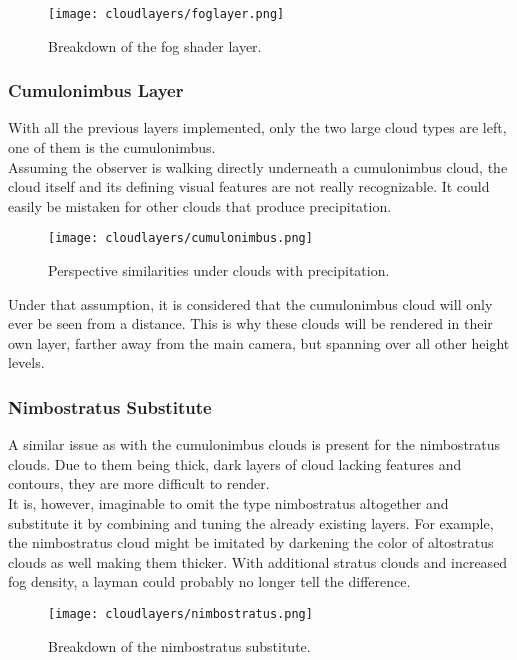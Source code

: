 \begin{figure}[H]
    \texttt{[image: cloudlayers/foglayer.png]}
    \caption{Breakdown of the fog shader layer.}
    \label{img:cloudlayer:fog}
\end{figure}

\pagebreak

\subsubsection{Cumulonimbus Layer}
\label{section:impl:layers:cumulonimbus}
With all the previous layers implemented, only the two large cloud types are left, one of them is the cumulonimbus.
\\
Assuming the observer is walking directly underneath a cumulonimbus cloud, the cloud itself and its defining visual features are not really recognizable.
It could easily be mistaken for other clouds that produce \gls{precipitation}.

\begin{figure}[H]
    \texttt{[image: cloudlayers/cumulonimbus.png]}
    \caption{Perspective similarities under clouds with \gls{precipitation}.}
    \label{img:cloudlayer:cumulonimbus}
\end{figure}

\noindent
Under that assumption, it is considered that the cumulonimbus cloud will only ever be seen from a distance.
This is why these clouds will be rendered in their own layer, farther away from the main camera, but spanning over all other height levels.

\pagebreak

\subsubsection{Nimbostratus Substitute}
A similar issue as with the cumulonimbus clouds is present for the nimbostratus clouds.
Due to them being thick, dark layers of cloud lacking features and contours, they are more difficult to render.
\\
It is, however, imaginable to omit the type nimbostratus altogether and substitute it by combining and tuning the already existing layers.
For example, the nimbostratus cloud might be imitated by darkening the color of altostratus clouds as well making them thicker. 
With additional stratus clouds and increased fog density, a layman could probably no longer tell the difference.

\begin{figure}[H]
    \texttt{[image: cloudlayers/nimbostratus.png]}
    \caption{Breakdown of the nimbostratus substitute.}
    \label{img:cloudlayer:nimbostratus}
\end{figure}

